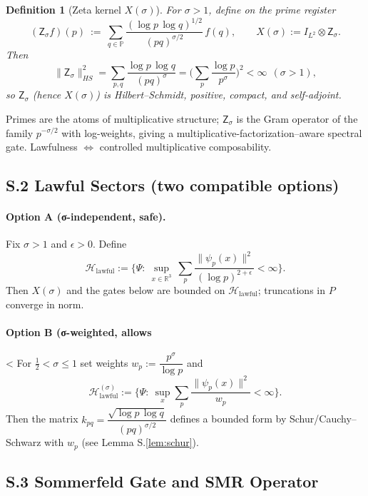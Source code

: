 \documentclass[12]{amsart}
\theoremstyle{plain}
\newtheorem{definition}[theorem]{Definition}
\begin{document}
\begin{definition}[Zeta kernel $X(\sigma)$]
For $\sigma>1$, define on the prime register
\[
(\mathsf Z_\sigma f)(p)\ :=\ \sum_{q\in\mathbb P}\frac{(\log p\,\log q)^{1/2}}{(pq)^{\sigma/2}}\,f(q),\qquad
X(\sigma):=I_{L^2}\otimes \mathsf Z_\sigma.
\]
Then
\[
\|\mathsf Z_\sigma\|_{HS}^2=\sum_{p,q}\frac{\log p\,\log q}{(pq)^{\sigma}}
=\Big(\sum_{p}\frac{\log p}{p^\sigma}\Big)^2<\infty \ \ (\sigma>1),
\]
so $\mathsf Z_\sigma$ (hence $X(\sigma)$) is Hilbert--Schmidt, positive, compact, and self-adjoint.
\end{definition}

\begin{remark}
Primes are the atoms of multiplicative structure; $\mathsf Z_\sigma$ is the Gram operator of the family $p^{-\sigma/2}$ with log-weights, giving a multiplicative-factorization--aware spectral gate. Lawfulness $\Leftrightarrow$ controlled multiplicative composability.
\end{remark}

\subsection*{S.2 Lawful Sectors (two compatible options)}

\paragraph{Option A (σ-independent, safe).}
Fix $\sigma>1$ and $\epsilon>0$. Define
\[
\mathcal H_{\mathrm{lawful}}
:=\Big\{\Psi:\ \sup_{x\in\mathbb R^3}\ \sum_{p}\frac{\|\psi_p(x)\|^2}{(\log p)^{2+\epsilon}}<\infty\Big\}.
\]
Then $X(\sigma)$ and the gates below are bounded on $\mathcal H_{\mathrm{lawful}}$; truncations in $P$ converge in norm.

\paragraph{Option B (σ-weighted, allows }<\sigma{}
For $\tfrac12<\sigma\le 1$ set weights $w_p:=\dfrac{p^\sigma}{\log p}$ and
\[
\mathcal H_{\mathrm{lawful}}^{(\sigma)}
:=\Big\{\Psi:\ \sup_{x}\sum_{p}\frac{\|\psi_p(x)\|^2}{w_p}<\infty\Big\}.
\]
Then the matrix $k_{pq}=\dfrac{\sqrt{\log p\,\log q}}{(pq)^{\sigma/2}}$ defines a bounded form by Schur/Cauchy–Schwarz with $w_p$ (see Lemma S.\ref{lem:schur}).

\subsection*{S.3 Sommerfeld Gate and SMR Operator}
\end{document}
